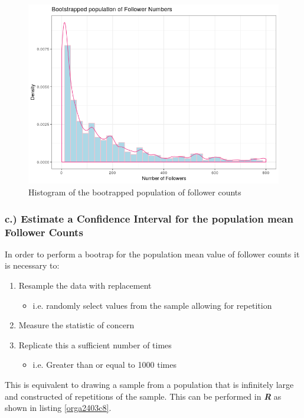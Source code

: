 \documentclass[11pt]{article}
\begin{document}
\begin{figure}[htbp]
\centering
\includegraphics[width=12cm]{./Figures/BootStrap_Pop.png}
\caption{\label{fig:org17e811a}Histogram of the bootrapped population of follower counts}
\end{figure}

\subsubsection{c.) Estimate a Confidence Interval for the population mean Follower Counts}
\label{sec:org0126d40}
In order to perform a bootrap for the population mean value of follower counts it is necessary to:

\begin{enumerate}
\item Resample the data with replacement
\begin{itemize}
\item i.e. randomly select values from the sample allowing for repetition
\end{itemize}
\item Measure the statistic of concern
\item Replicate this a sufficient number of times
\begin{itemize}
\item i.e. Greater than or equal to 1000 times \cite[Ch. 5]{davison1997}
\end{itemize}
\end{enumerate}

This is equivalent to drawing a sample from a population that is infinitely large and constructed of repetitions of the sample. This can be performed in \textbf{\emph{R}} as shown in listing \ref{orga2403c8}.
\end{document}
